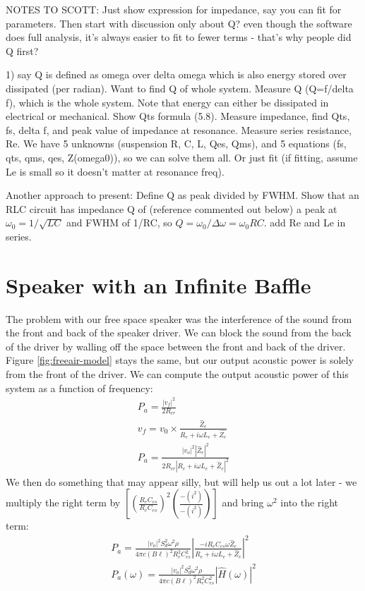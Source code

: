 \documentclass[10pt]{book}
\begin{document}
NOTES TO SCOTT: Just show expression for impedance, say you can fit for parameters. Then  start with discussion only about Q? even though the software does full analysis, it's always easier to fit to fewer terms - that's why people did Q first?

1) say Q is defined as omega over delta omega which is also energy stored over dissipated (per radian). Want to find Q of whole system. Measure Q (Q=f/delta f), which is the whole system. Note that energy can either be dissipated in electrical or mechanical. Show Qts formula (5.8). Measure impedance, find Qts, fs, delta f, and peak value of impedance at resonance. Measure series resistance, Re. We have 5 unknowns (suspension R, C, L, Qes, Qms), and 5 equations (fs, qts, qms, qes, Z(omega0)), so we can solve them all. Or just fit (if fitting, assume Le is small so it doesn't matter at resonance freq). 

 Another approach to present: Define Q as peak divided by FWHM. Show that an RLC circuit  has impedance Q of (reference commented out below) a peak at $\omega_0=1/\sqrt{LC}$ and FWHM of  1/RC, so $Q=\omega_0/\Delta \omega=\omega_0 RC$. add Re and Le in series.



\section{Speaker with an Infinite Baffle}
The problem with our free space speaker was the interference of the sound from the front and back of the speaker driver. We can block the sound from the back of the driver by walling off the space between the front and back of the driver. Figure \ref{fig:freeair-model} stays the same, but our output acoustic power is solely from the front of the driver. We can compute the output acoustic power of this system as a function of frequency:
\begin{align}
P_a=\frac{\left| v_f \right|^2}{2R_{er}}\\
v_f=v_0\times\frac{\hat{Z}_e}{R_e+i\omega L_e+\hat{Z_e}}\\
P_a=\frac{\left| v_o \right|^2 \left| \hat{Z}_e \right|^2 }{2R_{er}\left| R_e+i\omega L_e+\hat{Z}_e\right|^2}
\end{align}
We then do something that may appear silly, but will help us out a lot later - we multiply the right term by $\left[ \left(\frac{R_{e} C_{es}}{R_{e}C_{es}}\right)^2\left( \frac{-(i^2)}{-(i^2)} \right) \right] $ and bring $\omega^2$ into the right term:
\begin{align}
P_a=\frac{\left| v_o \right|^2S_d^2\omega^2 \rho}{
4\pi c (B\ell)^2 R_{e}^2 C_{es}^2
}\left| \frac{ -i R_{e} C_{es} \omega \hat{Z}_e }{ R_e+i\omega L_e+\hat{Z}_e} \right|^2\\
P_a(\omega)=\frac{\left| v_o \right|^2S_d^2\omega^2 \rho}{
4\pi c (B\ell)^2 R_{e}^2 C_{es}^2
}\left| \hat{H}(\omega) \right|^2 \label{eq:acostic-power}
\end{align}
\end{document}
